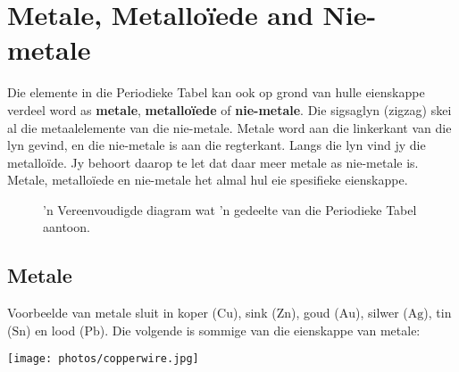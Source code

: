             \section{Metale, Metallo\"iede and Nie-metale}
            \nopagebreak
      \label{m38708*id65693}Die elemente in die Periodieke Tabel kan ook op grond van hulle eienskappe verdeel word as \textbf{metale}, \textbf{metallo\"iede} of \textbf{nie-metale}. Die sigsaglyn (zigzag) skei al die metaalelemente van die nie-metale. Metale word aan die linkerkant van die lyn gevind, en die nie-metale is aan die regterkant. Langs die lyn vind jy die metalloïde. Jy behoort daarop te let dat daar meer metale as nie-metale is. Metale, metalloïede en nie-metale het almal hul eie spesifieke eienskappe.\par 


\begin{figure}[h]

\begin{center}
\end{center}
\caption{ 'n Vereenvoudigde diagram wat  'n gedeelte van die Periodieke Tabel aantoon.}
\label{fig:periodic}
\end{figure} 
      \label{m38708*uid76}
            \subsection*{Metale}
            \nopagebreak
\begin{minipage}{.5\textwidth}
        \label{m38708*id65726}Voorbeelde van metale sluit in koper ($\text{Cu}$), sink ($\text{Zn}$), goud ($\text{Au}$), silwer ($\text{Ag}$), tin ($\text{Sn}$) en lood ($\text{Pb}$). Die volgende is sommige van die eienskappe van metale:\par 
\end{minipage}
\begin{minipage}{.5\textwidth}
\begin{center}
 \texttt{[image: photos/copperwire.jpg]}
\end{center}
\end{minipage}

